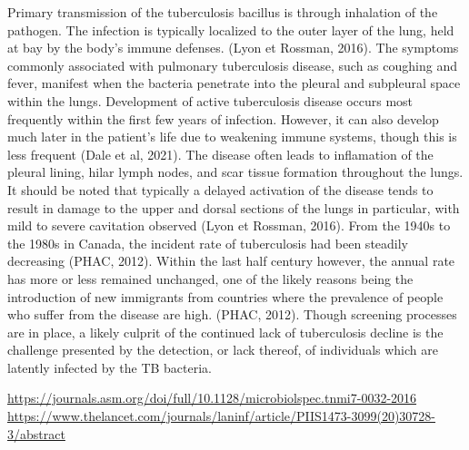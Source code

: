 \documentclass[sn-mathphys,Numbered]{sn-jnl}%
\theoremstyle{thmstyleone}%
\theoremstyle{thmstyletwo}%
\theoremstyle{thmstylethree}%
\begin{document}
    Primary transmission of the tuberculosis bacillus is through inhalation of the pathogen. The infection is typically localized to the outer layer of the lung, held at bay by the body's immune defenses. (Lyon et Rossman, 2016). The symptoms commonly associated with pulmonary tuberculosis disease, such as coughing and fever, manifest when the bacteria penetrate into the pleural and subpleural space within the lungs. Development of active tuberculosis disease occurs most frequently within the first few years of infection. However, it can also develop much later in the patient's life due to weakening immune systems, though this is less frequent (Dale et al, 2021). The disease often leads to inflamation of the pleural lining, hilar lymph nodes, and scar tissue formation throughout the lungs. It should be noted that typically a delayed activation of the disease tends to result in damage to the upper and dorsal sections of the lungs in particular, with mild to severe cavitation observed (Lyon et Rossman, 2016). From the 1940s to the 1980s in Canada, the incident rate of tuberculosis had been steadily decreasing (PHAC, 2012). Within the last half century however, the annual rate has more or less remained unchanged, one of the likely reasons being the introduction of new immigrants from countries where the prevalence of people who suffer from the disease are high. (PHAC, 2012). Though screening processes are in place, a likely culprit of the continued lack of tuberculosis decline is the challenge presented by the detection, or lack thereof, of individuals which are latently infected by the TB bacteria.
    
\url{https://journals.asm.org/doi/full/10.1128/microbiolspec.tnmi7-0032-2016}
\url{https://www.thelancet.com/journals/laninf/article/PIIS1473-3099(20)30728-3/abstract}
\end{document}

